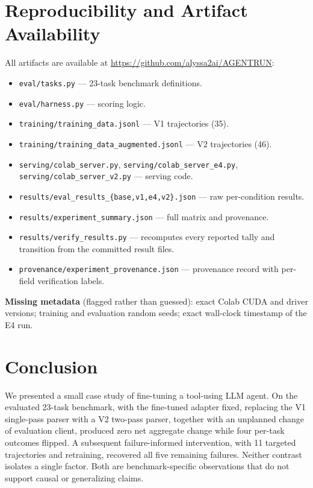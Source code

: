 \documentclass[10pt,twocolumn]{article}
\newcommand{\code}[1]{\texttt{#1}}
\begin{document}
\section{Reproducibility and Artifact Availability}

All artifacts are available at \url{https://github.com/alyssa2ai/AGENTRUN}:
\begin{itemize}\itemsep2pt
\item \code{eval/tasks.py} --- 23-task benchmark definitions.
\item \code{eval/harness.py} --- scoring logic.
\item \code{training/training\_data.jsonl} --- V1 trajectories (35).
\item \code{training/training\_data\_augmented.jsonl} --- V2 trajectories (46).
\item \code{serving/colab\_server.py}, \code{serving/colab\_server\_e4.py}, \code{serving/colab\_server\_v2.py} --- serving code.
\item \code{results/eval\_results\_\{base,v1,e4,v2\}.json} --- raw per-condition results.
\item \code{results/experiment\_summary.json} --- full matrix and provenance.
\item \code{results/verify\_results.py} --- recomputes every reported tally and transition from the committed result files.
\item \code{provenance/experiment\_provenance.json} --- provenance record with per-field verification labels.
\end{itemize}

\textbf{Missing metadata} (flagged rather than guessed): exact Colab CUDA and driver versions; training and evaluation random seeds; exact wall-clock timestamp of the E4 run.

\section{Conclusion}

We presented a small case study of fine-tuning a tool-using LLM agent. On the evaluated 23-task benchmark, with the fine-tuned adapter fixed, replacing the V1 single-pass parser with a V2 two-pass parser, together with an unplanned change of evaluation client, produced zero net aggregate change while four per-task outcomes flipped. A subsequent failure-informed intervention, with 11 targeted trajectories and retraining, recovered all five remaining failures. Neither contrast isolates a single factor. Both are benchmark-specific observations that do not support causal or generalizing claims.
\end{document}

